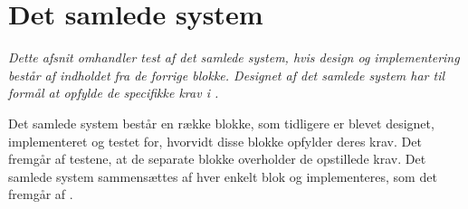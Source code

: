 \section{Det samlede system}
\textit{Dette afsnit omhandler test af det samlede system, hvis design og implementering består af indholdet fra de forrige blokke. Designet af det samlede system har til formål at opfylde de specifikke krav i .}

Det samlede system består en række blokke, som tidligere er blevet designet, implementeret og testet for, hvorvidt disse blokke opfylder deres krav. Det fremgår af testene, at de separate blokke overholder de opstillede krav. Det samlede system sammensættes af hver enkelt blok og implementeres, som det fremgår af .%

